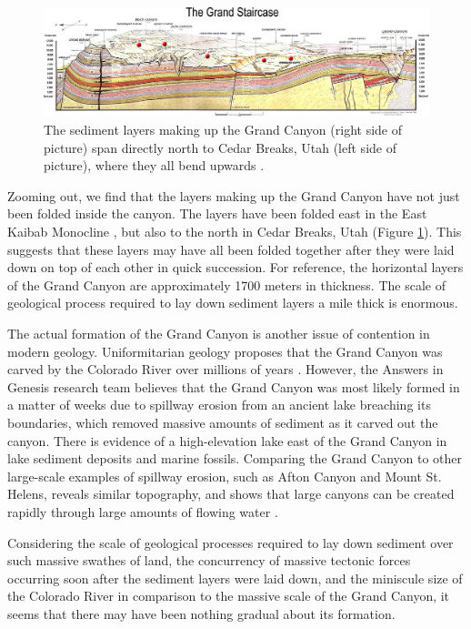 \documentclass[10pt,twocolumn,letterpaper]{article}
\begin{document}
\begin{figure}
\begin{center}
\includegraphics[width=1\textwidth]{Grand_Staircase-big.jpg}
\end{center}
   \caption{The sediment layers making up the Grand Canyon (right side of picture) span directly north to Cedar Breaks, Utah (left side of picture), where they all bend upwards \cite{50}.}
\label{fig:4}
\end{figure}

Zooming out, we find that the layers making up the Grand Canyon have not just been folded inside the canyon. The layers have been folded east in the East Kaibab Monocline \cite{46}, but also to the north in Cedar Breaks, Utah (Figure \ref{fig:4}). This suggests that these layers may have all been folded together after they were laid down on top of each other in quick succession. For reference, the horizontal layers of the Grand Canyon are approximately 1700 meters in thickness. The scale of geological process required to lay down sediment layers a mile thick is enormous.

The actual formation of the Grand Canyon is another issue of contention in modern geology. Uniformitarian geology proposes that the Grand Canyon was carved by the Colorado River over millions of years \cite{47}. However, the Answers in Genesis research team believes that the Grand Canyon was most likely formed in a matter of weeks due to spillway erosion from an ancient lake breaching its boundaries, which removed massive amounts of sediment as it carved out the canyon. There is evidence of a high-elevation lake east of the Grand Canyon in lake sediment deposits and marine fossils. Comparing the Grand Canyon to other large-scale examples of spillway erosion, such as Afton Canyon and Mount St. Helens, reveals similar topography, and shows that large canyons can be created rapidly through large amounts of flowing water \cite{48}.

Considering the scale of geological processes required to lay down sediment over such massive swathes of land, the concurrency of massive tectonic forces occurring soon after the sediment layers were laid down, and the miniscule size of the Colorado River in comparison to the massive scale of the Grand Canyon, it seems that there may have been nothing gradual about its formation.
\end{document}
